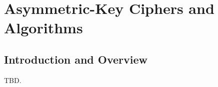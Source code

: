 \chapter{Asymmetric-Key Ciphers and Algorithms}
\label{cakc0}

\section{Introduction and Overview}
\label{cakc0:siov0}

TBD.

